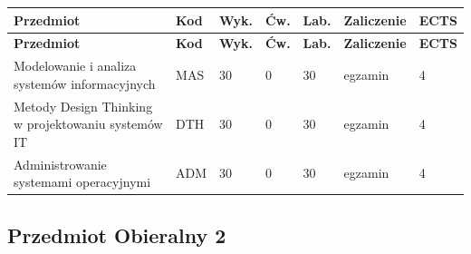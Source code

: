 \documentclass[12pt,a4paper]{article}
\newcommand{\thdrule}{\noalign{\global\setlength{\extrarowheight}{0pt}}}
\newcommand{\thdend}{\noalign{\global\setlength{\extrarowheight}{4pt}}}
\begin{document}
{\scriptsize
\begin{longtable}{m{5.5cm}m{0.8cm}m{1cm}m{1cm}m{1cm}m{1.7cm}m{0.7cm}}
\thdrule\toprule
\rowcolor{pjatkRed}
{\color{white}\footnotesize\textbf{\vphantom{Ag}Przedmiot}} & {\color{white}\footnotesize\textbf{\vphantom{Ag}Kod}} & {\color{white}\footnotesize\textbf{\vphantom{Ag}Wyk.}} & {\color{white}\footnotesize\textbf{\vphantom{Ag}Ćw.}} & {\color{white}\footnotesize\textbf{\vphantom{Ag}Lab.}} & {\color{white}\footnotesize\textbf{\vphantom{Ag}Zaliczenie}} & {\color{white}\footnotesize\textbf{\vphantom{Ag}ECTS}} \\
\midrule\thdend
\endfirsthead
\thdrule\toprule
\rowcolor{pjatkRed}
{\color{white}\footnotesize\textbf{\vphantom{Ag}Przedmiot}} & {\color{white}\footnotesize\textbf{\vphantom{Ag}Kod}} & {\color{white}\footnotesize\textbf{\vphantom{Ag}Wyk.}} & {\color{white}\footnotesize\textbf{\vphantom{Ag}Ćw.}} & {\color{white}\footnotesize\textbf{\vphantom{Ag}Lab.}} & {\color{white}\footnotesize\textbf{\vphantom{Ag}Zaliczenie}} & {\color{white}\footnotesize\textbf{\vphantom{Ag}ECTS}} \\
\midrule\thdend
\endhead
\rowcolor{tableRowLight} Modelowanie i analiza systemów informacyjnych & MAS & 30 & 0 & 30 & {\scriptsize egzamin} & 4 \\
\rowcolor{tableRowAlt} Metody Design Thinking w projektowaniu systemów IT & DTH & 30 & 0 & 30 & {\scriptsize egzamin} & 4 \\
\rowcolor{tableRowLight} Administrowanie systemami operacyjnymi & ADM & 30 & 0 & 30 & {\scriptsize egzamin} & 4 \\
\bottomrule
\end{longtable}}

\subsection*{Przedmiot Obieralny 2}
\end{document}
